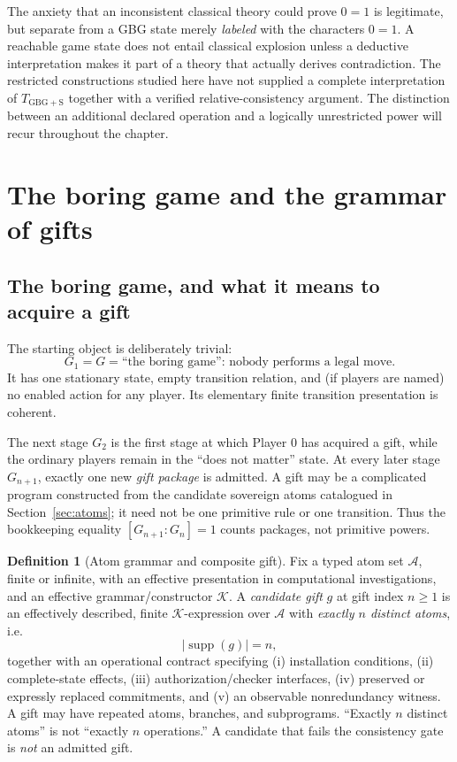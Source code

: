 \documentclass[11pt,letterpaper]{article}
\theoremstyle{definition}\newtheorem{definition}[theorem]{Definition}\newtheorem{example}[theorem]{Example}
\theoremstyle{remark}\newtheorem{remark}[theorem]{Remark}
\newcommand{\Abs}{\mathcal{A}}
\begin{document}
The anxiety that an inconsistent classical theory could prove $0=1$ is legitimate, but separate from a GBG state merely \emph{labeled} with the characters $0=1$. A reachable game state does not entail classical explosion unless a deductive interpretation makes it part of a theory that actually derives contradiction. The restricted constructions studied here have not supplied a complete
interpretation of $T_{\mathrm{GBG+S}}$ together with a verified relative-consistency
argument. The distinction between an additional declared operation and a
logically unrestricted power will recur throughout the chapter.

\section{The boring game and the grammar of gifts}\label{sec:boring-gift}
\subsection{The boring game, and what it means to acquire a gift}
The starting object is deliberately trivial:
\[
G_1=G=\text{``the boring game'': nobody performs a legal move.}
\]
It has one stationary state, empty transition relation, and (if players are named) no enabled action for any player. Its elementary finite transition presentation is coherent.

The next stage $G_2$ is the first stage at which Player 0 has acquired a gift,
while the ordinary players remain in the ``does not matter'' state. At every
later stage $G_{n+1}$, exactly one new \emph{gift package} is admitted. A gift
may be a complicated program constructed from the candidate sovereign atoms
catalogued in Section~\ref{sec:atoms}; it need not be one primitive rule or
one transition. Thus the bookkeeping equality $[G_{n+1}:G_n]=1$ counts
packages, not primitive powers.

\begin{definition}[Atom grammar and composite gift]\label{w0:def:gift}
Fix a typed atom set $\Abs$, finite or infinite, with an effective presentation in computational investigations, and an effective grammar/constructor $\mathcal K$. A \emph{candidate gift} $g$ at gift index $n\ge1$ is an effectively described, finite $\mathcal K$-expression over $\Abs$ with \emph{exactly $n$ distinct atoms}, i.e.
\[
|\operatorname{supp}(g)|=n,
\]
together with an operational contract specifying (i) installation conditions, (ii) complete-state effects, (iii) authorization/checker interfaces, (iv) preserved or expressly replaced commitments, and (v) an observable nonredundancy witness. A gift may have repeated atoms, branches, and subprograms. ``Exactly $n$ distinct atoms'' is not ``exactly $n$ operations.'' A candidate that fails the consistency gate is \emph{not} an admitted gift.
\end{definition}
\end{document}
